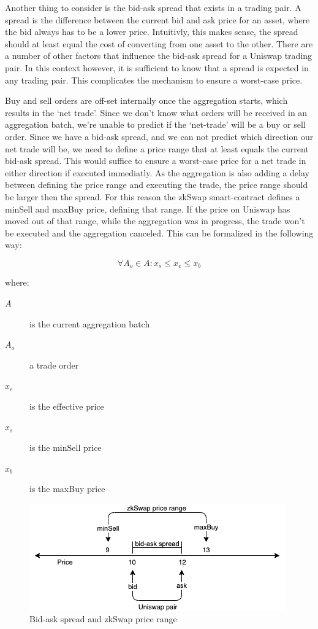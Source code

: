 \documentclass[../../thesis.tex]{subfiles}
\begin{document}
Another thing to consider is the bid-ask spread that exists in a trading pair. A spread is the difference between the current bid and ask price for an asset, where the bid always has to be a lower price. Intuitivly, this makes sense, the spread should at least equal the cost of converting from one asset to the other. There are a number of other factors that influence the bid-ask spread for a Uniswap trading pair. In this context however, it is sufficient to know that a spread is expected in any trading pair. This complicates the mechanism to ensure a worst-case price. 

Buy and sell orders are off-set internally once the aggregation starts, which results in the `net trade'. Since we don't know what orders will be received in an aggregation batch, we're unable to predict if the `net-trade' will be a buy or sell order. Since we have a bid-ask spread, and we can not predict which direction our net trade will be, we need to define a price range that at least equals the current bid-ask spread. This would suffice to ensure a worst-case price for a net trade in either direction if executed immediatly.
As the aggregation is also adding a delay between defining the price range and executing the trade, the price range should be larger then the spread. For this reason the zkSwap smart-contract defines a minSell and maxBuy price, defining that range. If the price on Uniswap has moved out of that range, while the aggregation was in progress, the trade won't be executed and the aggregation canceled. This can be formalized in the following way: 

$$\forall A_o\in A: x_s \leq x_e \leq x_b$$


where:
\begin{description}
\item[$A$] is the current aggregation batch
\item[$A_o$] a trade order
\item[$x_e$] is the effective price 
\item[$x_s$] is the minSell price
\item[$x_b$] is the maxBuy price 
\end{description}

\begin{figure}[h]
    \centerline{\includegraphics[totalheight=3cm]{diagrams/priceing.png}}
    \caption{Bid-ask spread and zkSwap price range}
    \label{fig:price}
\end{figure}
\end{document}
